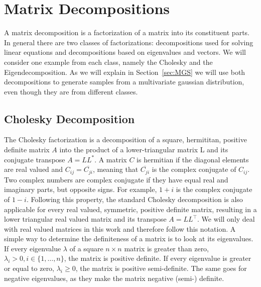 \section{Matrix Decompositions}

A matrix decomposition is a factorization of a matrix into its
constituent parts. In general there are two classes of factorizations:
decompositions used for solving linear equations and decompositions
based on eigenvalues and vectors. We will consider one example from each
class, namely the Cholesky and the Eigendecomposition. As we will
explain in Section~\ref{sec:MGS} we will use both decompositions to
generate samples from a multivariate gaussian distribution, even though
they are from different classes.

\subsection{Cholesky Decomposition}\label{sec:cholesky}

The Cholesky factorization is a decomposition of a square, hermititan,
positive definite matrix $A$ into the product of a lower-triangular
matrix L and its conjugate transpose $A = L L^*$. A matrix $C$ is
hermitian if the diagonal elements are real valued and $C_{ij} =
\overline{C_{ji}}$, meaning that $\overline{C_{ji}}$ is the complex
conjugate of $C_{ij}$. Two complex numbers are complex conjugate if they
have equal real and imaginary parts, but opposite signs. For example,
$1+i$ is the complex conjugate of $1-i$. Following this property, the
standard Cholesky decomposition is also applicable for every real
valued, symmetric, positive definite matrix, resulting in a lower
triangular real valued matrix and its transpose $A = L L^\top$. We
will only deal with real valued matrices in this work and therefore
follow this notation. A simple way to determine the definiteness of a
matrix is to look at its eigenvalues. If every eigenvalue $\lambda$ of a
square $n \times n$ matrix is greater than zero, $\lambda_{i} > 0, i \in
\{1,\dots,n\}$, the matrix is positive definite. If every eigenvalue is
greater or equal to zero, $\lambda_{i} \ge 0$, the matrix is positive
semi-definite. The same goes for negative eigenvalues, as they make the
matrix negative (semi-) definite.

